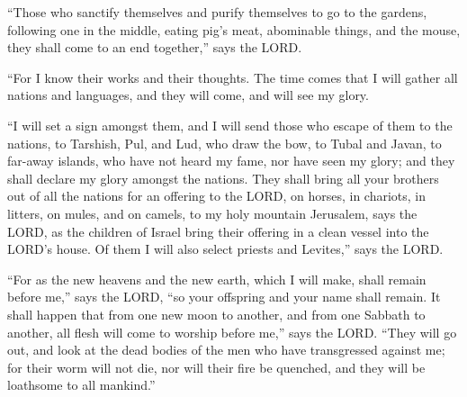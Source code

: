  ``Those who sanctify themselves and purify themselves to
go to the gardens, following one in the middle, eating pig's meat,
abominable things, and the mouse, they shall come to an end together,''
says the LORD.

 ``For I know their works and their thoughts. The time
comes that I will gather all nations and languages, and they will come,
and will see my glory.

 ``I will set a sign amongst them, and I will send those
who escape of them to the nations, to Tarshish, Pul, and Lud, who draw
the bow, to Tubal and Javan, to far-away islands, who have not heard my
fame, nor have seen my glory; and they shall declare my glory amongst
the nations.  They shall bring all your brothers out of
all the nations for an offering to the LORD, on horses, in chariots, in
litters, on mules, and on camels, to my holy mountain Jerusalem, says
the LORD, as the children of Israel bring their offering in a clean
vessel into the LORD's house.  Of them I will also select
priests and Levites,'' says the LORD.

 ``For as the new heavens and the new earth, which I will
make, shall remain before me,'' says the LORD, ``so your offspring and
your name shall remain.  It shall happen that from one
new moon to another, and from one Sabbath to another, all flesh will
come to worship before me,'' says the LORD.  ``They will
go out, and look at the dead bodies of the men who have transgressed
against me; for their worm will not die, nor will their fire be
quenched, and they will be loathsome to all mankind.''
